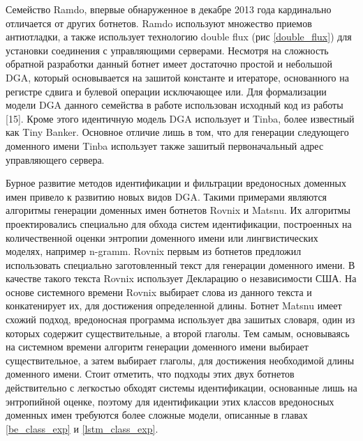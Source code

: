 Семейство Ramdo, впервые обнаруженное в декабре 2013 года кардинально отличается от других ботнетов. Ramdo используют множество приемов антиотладки, а также использует технологию double flux (рис \ref{double_flux}) для установки соединения с управляющими серверами. Несмотря на сложность обратной разработки данный ботнет имеет достаточно простой и небольшой DGA, который основывается на зашитой константе и итераторе, основанного на регистре сдвига и булевой операции исключающее или. Для формализации модели DGA данного семейства в работе использован исходный код из работы [15]. Кроме этого идентичную модель DGA использует и Tinba, более известный как Tiny Banker.  Основное отличие лишь в том, что для генерации следующего доменного имени Tinba использует также зашитый первоначальный адрес управляющего сервера.

Бурное развитие методов идентификации и фильтрации вредоносных доменных имен привело к развитию новых видов DGA. Такими примерами являются алгоритмы генерации доменных имен ботнетов Rovnix и Matsnu. Их алгоритмы проектировались специально для обхода систем идентификации, построенных на количественной оценки энтропии доменного имени или лингвистических моделях, например n-gramm. Rovnix первым из ботнетов предложил использовать специально заготовленный текст для генерации доменного имени. В качестве такого текста Rovnix использует Декларацию о независимости США. На основе системного времени Rovnix выбирает слова из данного текста и конкатенирует их, для достижения определенной длины. Ботнет Matsnu имеет схожий подход, вредоносная программа использует два зашитых словаря, один из которых содержит существительные, а второй глаголы. Тем самым, основываясь на системном времени алгоритм генерации доменного имени выбирает существительное, а затем выбирает глаголы, для достижения необходимой длины доменного имени. Стоит отметить, что подходы этих двух ботнетов действительно с легкостью обходят системы идентификации, основанные лишь на энтропийной оценке, поэтому для идентификации этих классов вредоносных доменных имен требуются более сложные модели, описанные в главах \ref{be_class_exp} и \ref{lstm_class_exp}.
\clearpage

